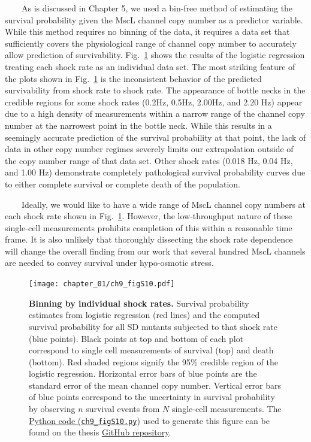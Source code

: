 \documentclass[12pt]{caltech_thesis}
\begin{document}
~~~~As is discussed in Chapter 5, we used a bin-free method of
estimating the survival probability given the MscL channel copy number
as a predictor variable. While this method requires no binning of the
data, it requires a data set that sufficiently covers the physiological
range of channel copy number to accurately allow prediction of
survivability. Fig.~\ref{fig:indiv_shock_group} shows the results of the
logistic regression treating each shock rate as an individual data set.
The most striking feature of the plots shown in
Fig.~\ref{fig:indiv_shock_group} is the inconsistent behavior of the
predicted survivability from shock rate to shock rate. The appearance of
bottle necks in the credible regions for some shock rates (0.2Hz, 0.5Hz,
2.00Hz, and 2.20 Hz) appear due to a high density of measurements within
a narrow range of the channel copy number at the narrowest point in the
bottle neck. While this results in a seemingly accurate prediction of
the survival probability at that point, the lack of data in other copy
number regimes severely limits our extrapolation outside of the copy
number range of that data set. Other shock rates (0.018 Hz, 0.04 Hz, and
1.00 Hz) demonstrate completely pathological survival probability curves
due to either complete survival or complete death of the population.

~~~~Ideally, we would like to have a wide range of MscL channel copy
numbers at each shock rate shown in Fig.~\ref{fig:indiv_shock_group}.
However, the low-throughput nature of these single-cell measurements
prohibits completion of this within a reasonable time frame. It is also
unlikely that thoroughly dissecting the shock rate dependence will
change the overall finding from our work that several hundred MscL
channels are needed to convey survival under hypo-osmotic stress.

\hypertarget{fig:indiv_shock_group}{%
\begin{figure}
\centering
\texttt{[image: chapter\_01/ch9\_figS10.pdf]}
\caption[{Binning by individual shock rates.}]{\textbf{Binning by
individual shock rates.} Survival probability estimates from logistic
regression (red lines) and the computed survival probability for all SD
mutants subjected to that shock rate (blue points). Black points at top
and bottom of each plot correspond to single cell measurements of
survival (top) and death (bottom). Red shaded regions signify the 95\%
credible region of the logistic regression. Horizontal error bars of
blue points are the standard error of the mean channel copy number.
Vertical error bars of blue points correspond to the uncertainty in
survival probability by observing \(n\) survival events from \(N\)
single-cell measurements. The
\href{https://github.com/gchure/phd/blob/master/src/chapter_09/code/ch9_figS10.py}{Python
code (\texttt{ch9\_figS10.py})} used to generate this figure can be
found on the thesis \href{https://github.com/gchure/phd}{GitHub
repository}.}
\label{fig:indiv_shock_group}
\end{figure}
}
\end{document}
